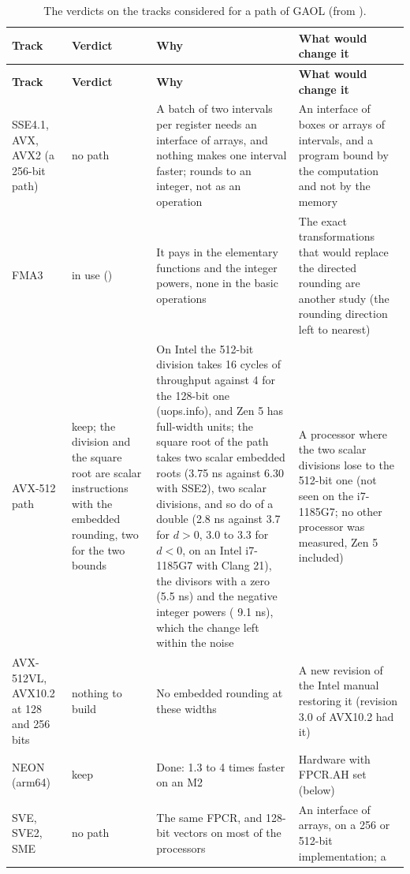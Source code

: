 \documentclass[12pt,a4paper,twoside,openright]{book}
\begin{document}
\begingroup\footnotesize
\begin{longtable}{|L{2.3cm}|L{2.3cm}|L{5.0cm}|L{3.4cm}|}
\caption{The verdicts on the tracks considered for a path of GAOL (from
).}\label{tab:computing-verdicts}\\
\hline
\textbf{Track} & \textbf{Verdict} & \textbf{Why} & \textbf{What would
change it} \\
\hline
\endfirsthead
\hline
\textbf{Track} & \textbf{Verdict} & \textbf{Why} & \textbf{What would
change it} \\
\hline
\endhead
\hline
\endfoot
\endlastfoot
SSE4.1, AVX, AVX2 (a 256-bit path) & no path & A batch of two intervals per
register needs an interface of arrays, and nothing makes one interval
faster;  rounds to an integer, not as an operation & An
interface of boxes or arrays of intervals, and a program bound by the
computation and not by the memory \\
\hline
FMA3 & in use () & It pays in the elementary functions and
the integer powers, none in the basic operations & The exact
transformations that would replace the directed rounding are another study
(the rounding direction left to nearest) \\
\hline
AVX-512 path & keep; the division and the square root are scalar
instructions with the embedded rounding, two for the two bounds & On Intel
the 512-bit division takes 16 cycles of throughput against 4 for the
128-bit one (uops.info), and Zen 5 has full-width units; the square root of
the path takes two scalar embedded roots (3.75 ns against 6.30 with SSE2),
 two scalar divisions, and so do  of a double
(2.8 ns against 3.7 for $d > 0$, 3.0 to 3.3 for $d < 0$, on an Intel
i7-1185G7 with Clang 21), the divisors with a zero (5.5 ns) and the negative
integer powers ( 9.1 ns), which the change left within the
noise & A processor where the two scalar divisions lose to the 512-bit one
(not seen on the i7-1185G7; no other processor was measured, Zen 5
included) \\
\hline
AVX-512VL, AVX10.2 at 128 and 256 bits & nothing to build & No embedded
rounding at these widths & A new revision of the Intel manual restoring it
(revision 3.0 of AVX10.2 had it) \\
\hline
NEON (arm64) & keep & Done: 1.3 to 4 times faster on an M2 & Hardware with
FPCR.AH set (below) \\
\hline
SVE, SVE2, SME & no path & The same FPCR, and 128-bit vectors on most of the
processors & An interface of arrays, on a 256 or 512-bit implementation; a

\end{longtable}
\end{document}
